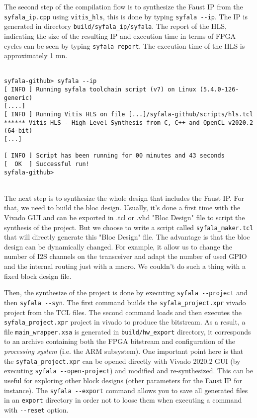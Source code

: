 The second step of the compilation flow is to synthesize the Faust IP from the {\tt syfala\_ip.cpp} using {\tt vitis\_hls}, this is done by typing \verb#syfala --ip#.
The IP is generated in directory {\tt build/syfala\_ip/syfala}. The report of the HLS, indicating the size of the resulting IP and execution time in terms of FPGA cycles can be seen by typing {\tt syfala report}.
The execution time of the HLS is approximately 1 mn.\\
~\\
\begin{boxedminipage}{\textwidth}
  \small
\begin{verbatim}
syfala-github> syfala --ip
[ INFO ] Running syfala toolchain script (v7) on Linux (5.4.0-126-generic)
[....]
[ INFO ] Running Vitis HLS on file [...]/syfala-github/scripts/hls.tcl
****** Vitis HLS - High-Level Synthesis from C, C++ and OpenCL v2020.2 (64-bit)
[...]

[ INFO ] Script has been running for 00 minutes and 43 seconds
[  OK  ] Successful run!
syfala-github>
\end{verbatim}
\end{boxedminipage}
~\\

The next step is to synthesize the whole design that includes the Faust IP. For that, we need to build the bloc design. Usually, it's done a first time with the Vivado GUI and can be exported in .tcl or .vhd "Bloc Design" file to script the synthesis of the project. But we choose to write a script called {\tt syfala\_maker.tcl} that will directly generate this "Bloc Design" file. The advantage is that the bloc design can be dynamically changed. For example, it allow us to change the number of I2S channels on the transceiver and adapt the number of used GPIO and the internal routing just with a macro. We couldn't do such a thing with a fixed block design file.

Then, the synthesize of the project is done by executing \verb#syfala --project# and then \verb#syfala --syn#. The first command builds the {\tt syfala\_project.xpr} vivado project from the TCL files. The second command loads and then executes the {\tt syfala\_project.xpr} project in vivado to produce the bitstream. As a result, a  file {\tt main\_wrapper.xsa} is generated in {\tt build/hw\_export} directory, it corresponds to an archive containing both the FPGA bitstream and configuration of the {\em processing system} (i.e. the ARM subsystem). One important point here is that the {\tt syfala\_project.xpr} can be opened directly with Vivado 2020.2 GUI (by executing \verb#syfala --open-project#) and modified and re-synthesized. This can be useful for exploring other block designs (other parameters for the Faust IP for instance). The \verb#syfala --export# command allows you to save all generated files in an {\tt export} directory in order not to loose them when executing a command with \verb#--reset# option.\\

